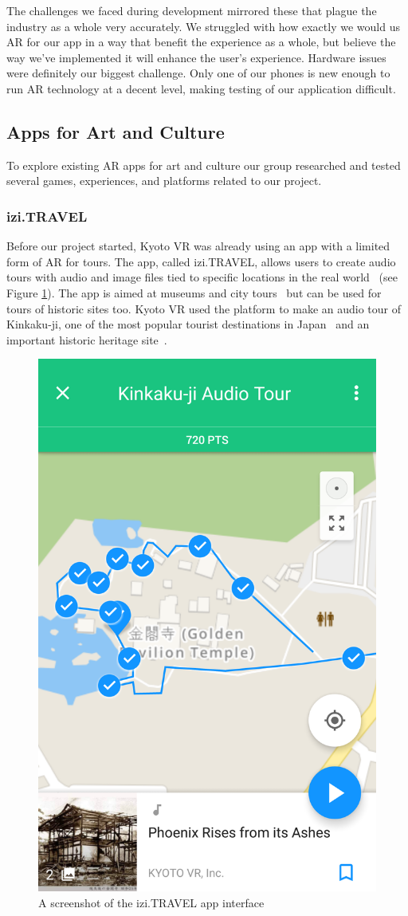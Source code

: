 \documentclass[a4paper, 10pt, american, titlepage]{article}
\begin{document}
The challenges we faced during development mirrored these that plague the
industry as a whole very accurately. We struggled with how exactly we would us
AR for our app in a way that benefit the experience as a whole, but believe the
way we've implemented it will enhance the user's experience. Hardware issues
were definitely our biggest challenge.  Only one of our phones is new enough to
run AR technology at a decent level, making testing of our application
difficult.  

\subsection{Apps for Art and Culture}
\label{sec:appsForArtAndCulture}

To explore existing AR apps for art and culture our group researched and tested
several games, experiences, and platforms related to our project.

\subsubsection{izi.TRAVEL}
\label{sec:iziTravel}

Before our project started, Kyoto VR was already using an app with a limited
form of AR for tours. The app, called izi.TRAVEL, allows users to create audio
tours with audio and image files tied to specific locations in the real
world~\autocite{izitravel2015} (see Figure \ref{fig:iziTravel}). The app is
aimed at museums and city tours~\autocite{izitravel} but can be used for tours
of historic sites too.  Kyoto VR used the platform to make an audio tour of
Kinkaku-ji, one of the most popular tourist destinations in
Japan~\autocite{bornoff2000} and an important historic heritage
site~\autocite{unesco}.

\begin{figure}[h]
	\centering
	\includegraphics[width=.5\textwidth]{izi-travel.png}
	\caption{A screenshot of the izi.TRAVEL app interface}
	\label{fig:iziTravel}
\end{figure}
\end{document}
